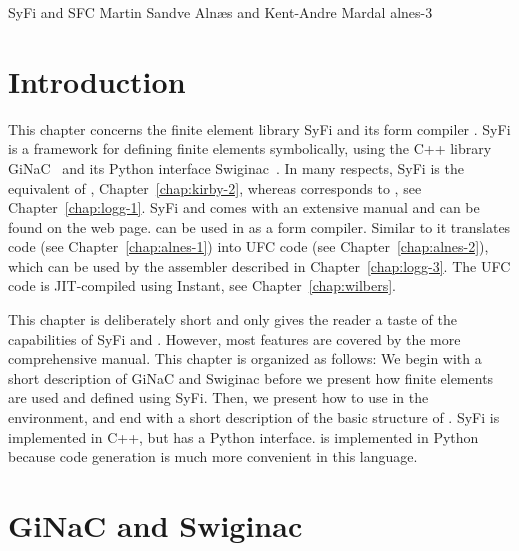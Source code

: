               {SyFi and SFC}
              {Martin Sandve Aln\ae{}s and Kent-Andre Mardal}
              {alnes-3}

\renewcommand{\AA}{A}
\newcommand{\LL}{L}
\newcommand{\JJ}{J}
\newcommand{\syfi}{SyFi}




\section{Introduction}

This chapter concerns the finite element library \syfi{} and its form
compiler \sfc{}.  \syfi{} is a framework for defining finite elements
symbolically, using the C++ library GiNaC~\citep{BauerFrinkKreckel2000}
and its Python interface Swiginac~\citep{SkavhaugCertik2009}.  In many
respects, \syfi{} is the equivalent of \fiat, Chapter~\ref{chap:kirby-2},
whereas \sfc{} corresponds to \ffc{}, see Chapter~\ref{chap:logg-1}. \syfi{}
and \sfc{} comes with an extensive manual \citep{AlnaesMardal2009a}
and can be found on the \fenics{} web page.  \sfc{} can be used in
\fenics{} as a form compiler. Similar to \ffc{} it translates
\ufl{} code (see Chapter~\ref{chap:alnes-1}) into UFC code (see
Chapter~\ref{chap:alnes-2}), which can be used by the \dolfin{} assembler
described in Chapter~\ref{chap:logg-3}. The UFC code is JIT-compiled
using Instant, see Chapter~\ref{chap:wilbers}.

This chapter is deliberately short and only gives the reader a taste of
the capabilities of \syfi{} and \sfc{}.  However, most features are covered by
the more comprehensive manual.  This chapter is organized as follows:
We begin with a short description of GiNaC and Swiginac before we
present how finite elements are used and defined using \syfi{}.  Then, we
present how to use \sfc{} in the \dolfin{} environment, and end with a short
description of the basic structure of \sfc{}. \syfi{} is implemented in C++,
but has a Python interface. \sfc{} is implemented in Python because code
generation is much more convenient in this language.

\section{GiNaC and Swiginac}

